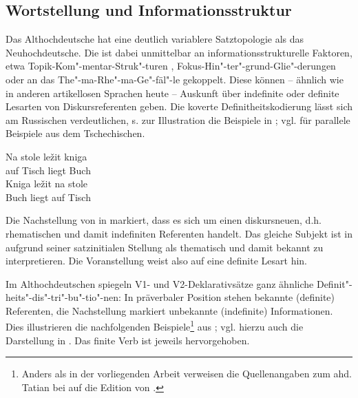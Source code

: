 \subsection{Wortstellung und Informationsstruktur} \label{is-ahd.}

Das Althochdeutsche hat eine deutlich variablere Satztopologie als das Neuhochdeutsche. Die  ist dabei unmittelbar an informationsstrukturelle  Faktoren, etwa Topik-Kom"-mentar-Struk"-turen
\parencite{Hinterholzl2005,Ramers2005,Solf2008}, Fokus-Hin"-ter"-grund-Glie"-derungen \parencite{Petrova2009} oder an das The"-ma-Rhe"-ma-Ge"-fäl"-le \parencite{Leiss2000} gekoppelt. Diese können -- ähnlich wie in anderen artikellosen Sprachen heute -- Auskunft über indefinite  oder definite  Lesarten von Diskursreferenten geben. Die koverte Definitheitskodierung  lässt sich am Russischen verdeutlichen, s. zur Illustration die Beispiele in  \parencite[s.][191]{Szczepaniak2015};  vgl.  \textcite[5]{Leiss2000} für parallele Beispiele aus dem Tschechischen. 

\begin{exe}
\settowidth{}
	\ex \label{ex:is}   
	\begin{xlist}
		\ex \label{ex:is-indef} 
		\gll Na stole ležit kniga\\
		auf Tisch liegt Buch\\
		\trans {}
		\ex \label{ex:is-def} 
		\gll Kniga ležit na stole\\
		Buch liegt auf Tisch\\
		\trans {}
	\end{xlist}
\end{exe}

\noindent
Die Nachstellung von  in  markiert, dass es sich um einen diskursneuen, d.h. rhematischen  und damit indefiniten Referenten  handelt. Das gleiche Subjekt  ist in  aufgrund seiner satzinitialen Stellung als thematisch  und damit bekannt zu interpretieren. Die Voranstellung  weist also auf eine definite Lesart hin.

Im Althochdeutschen spiegeln V1- und V2-Deklarativsätze ganz ähnliche Definit"-heits"-dis"-tri"-bu"-tio"-nen: In präverbaler Position stehen bekannte (definite) Referenten, die Nachstellung markiert unbekannte (indefinite)  Informationen. Dies illustrieren die nachfolgenden Beispiele\footnote{Anders als in der vorliegenden Arbeit verweisen die Quellenangaben zum ahd. Tatian bei \textcite{Hinterholzl2010} auf die Edition von \textcite{Masser1994}.} aus \textcite[316]{Hinterholzl2010}; vgl. hierzu auch die Darstellung in \textcite[46--47]{Ferraresi2014}. Das finite Verb ist jeweils hervorgehoben.

